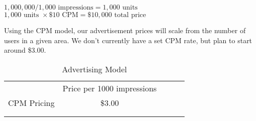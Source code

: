 \begin{center}
$1,000,000 / 1,000 \textrm{ impressions} = 1,000 \textrm{ units}$\\
$1,000 \textrm{ units } \times \$10 \textrm{ CPM} = \$10,000 \textrm{ total price}$
\end{center}

Using the CPM model, our advertisement prices will scale from the number of users in a given area. We don't currently have a set CPM rate, but plan to start around \$3.00.

\begin{table}[]
\centering
\caption{Advertising Model}
\label{my-label}
\begin{tabular}{lllll}
\cline{1-2}
\multicolumn{1}{|c|}{} & \multicolumn{1}{c|}{Price per 1000 impressions} & \multicolumn{1}{c}{} & \multicolumn{1}{c}{} &  \\ \cline{1-2}
\multicolumn{1}{|c|}{CPM Pricing} & \multicolumn{1}{c|}{\$3.00} & \multicolumn{1}{c}{} & \multicolumn{1}{c}{} &  \\ \cline{1-2}
                       &                       &                      &                      &  \\
                       &                       &                      &                      & 
\end{tabular}
\end{table}